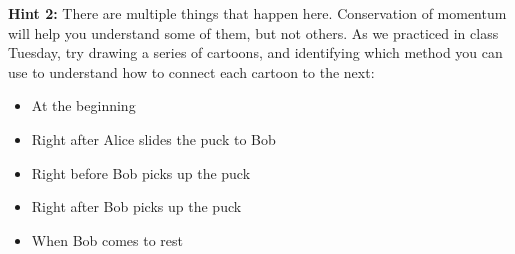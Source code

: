 \documentclass[12pt]{article}
\begin{document}
\begin{enumerate}
		{\bf Hint 2:} There are multiple things that happen here. Conservation of momentum will help you understand some of them, but not others. As we practiced in class Tuesday, try drawing a series of cartoons, and identifying which method you can use to understand how to connect each cartoon to the next:

		\begin{itemize}
	\item At the beginning
	\item Right after Alice slides the puck to Bob
	\item Right before Bob picks up the puck
	\item Right after Bob picks up the puck
	\item When Bob comes to rest
		\end{itemize}





\end{enumerate}
   
\end{document}
